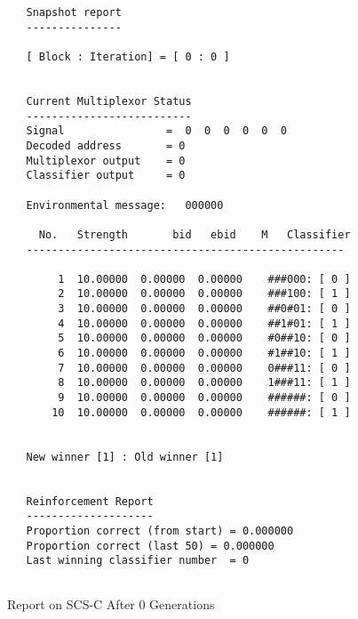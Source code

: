 \begin{figure}
\begin{center}
\begin{verbatim}
   Snapshot report
   ---------------
 
   [ Block : Iteration] = [ 0 : 0 ]
 
 
   Current Multiplexor Status
   --------------------------
   Signal                =  0  0  0  0  0  0
   Decoded address       = 0
   Multiplexor output    = 0
   Classifier output     = 0
 
   Environmental message:   000000
 
     No.   Strength       bid   ebid    M   Classifier
   --------------------------------------------------
 
        1  10.00000  0.00000  0.00000    ###000: [ 0 ]
        2  10.00000  0.00000  0.00000    ###100: [ 1 ]
        3  10.00000  0.00000  0.00000    ##0#01: [ 0 ]
        4  10.00000  0.00000  0.00000    ##1#01: [ 1 ]
        5  10.00000  0.00000  0.00000    #0##10: [ 0 ]
        6  10.00000  0.00000  0.00000    #1##10: [ 1 ]
        7  10.00000  0.00000  0.00000    0###11: [ 0 ]
        8  10.00000  0.00000  0.00000    1###11: [ 1 ]
        9  10.00000  0.00000  0.00000    ######: [ 0 ]
       10  10.00000  0.00000  0.00000    ######: [ 1 ]
 
 
   New winner [1] : Old winner [1]
 
 
   Reinforcement Report
   --------------------
   Proportion correct (from start) = 0.000000
   Proportion correct (last 50) = 0.000000
   Last winning classifier number  = 0


\end{verbatim}
\caption{Report on SCS-C After 0 Generations}
\label{gens0}
\end{center}
\end{figure}
 


